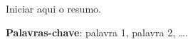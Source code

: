 \setlength{\absparsep}{18pt} %
\begin{resumo}
 
Iniciar aqui o resumo.

 \textbf{Palavras-chave}: palavra 1, palavra 2, \ldots.
\end{resumo}

